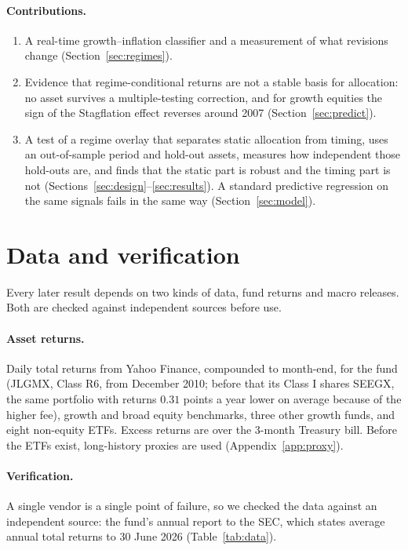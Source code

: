 \documentclass[11pt,a4paper]{article}
\begin{document}
\paragraph{Contributions.}
\begin{enumerate}
\item A real-time growth--inflation classifier and a measurement of what revisions change
(Section~\ref{sec:regimes}).
\item Evidence that regime-conditional returns are not a stable basis for allocation: no asset survives a
multiple-testing correction, and for growth equities the sign of the Stagflation effect reverses around 2007
(Section~\ref{sec:predict}).
\item A test of a regime overlay that separates static allocation from timing, uses an out-of-sample period
and hold-out assets, measures how independent those hold-outs are, and finds that the static part is robust and
the timing part is not (Sections~\ref{sec:design}--\ref{sec:results}). A standard predictive regression on the same
signals fails in the same way (Section~\ref{sec:model}).
\end{enumerate}

\section{Data and verification}
\label{sec:data}

Every later result depends on two kinds of data, fund returns and macro releases. Both are checked against independent sources before use.


\paragraph{Asset returns.} Daily total returns from Yahoo Finance, compounded to month-end, for the fund
(JLGMX, Class R6, from December 2010; before that its Class I shares SEEGX, the same portfolio with returns
$0.31$ points a year lower on average because of the higher fee), growth and broad equity benchmarks,
three other growth funds, and eight non-equity ETFs. Excess returns are over the 3-month Treasury bill. Before
the ETFs exist, long-history proxies are used (Appendix~\ref{app:proxy}).

\paragraph{Verification.} A single vendor is a single point of failure, so we checked the data against an
independent source: the fund's annual report to the SEC, which states average annual total returns to 30
June 2026 (Table~\ref{tab:data}).
\end{document}
